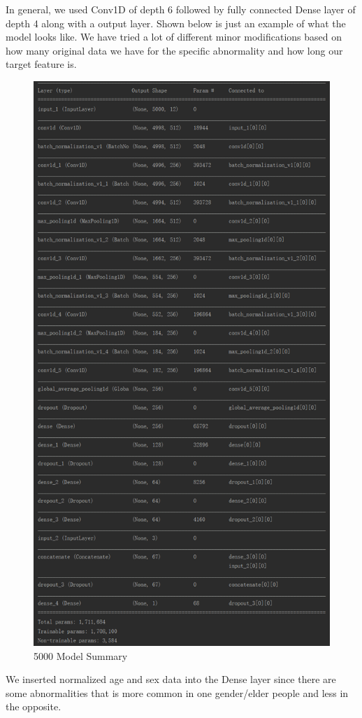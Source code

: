 \documentclass[%
 reprint,
 amsmath,amssymb,
 aps,
]{revtex4-2}
\begin{document}
In general, we used Conv1D of depth 6 followed by fully connected Dense layer of depth 4 along with a output layer. Shown below is just an example of what the model looks like. We have tried a lot of different minor modifications based on how many original data we have for the specific abnormality and how long our target feature is.
\begin{figure}[H]
	\includegraphics[width=\linewidth]{img/model_summary.png}
	\caption{\label{fig:model_summary_5000} 5000 Model Summary}
\end{figure}
We inserted normalized age and sex data into the Dense layer since there are some abnormalities that is more common in one gender/elder people and less in the opposite. 
 
\end{document}
